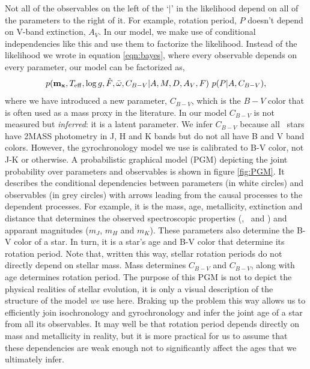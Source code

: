 Not all of the observables on the left of the `$|$' in the likelihood depend
on all of the parameters to the right of it.
For example, rotation period, $P$ doesn't depend on V-band extinction, $A_V$.
In our model, we make use of conditional independencies like this and use them
to factorize the likelihood.
Instead of the likelihood we wrote in equation \ref{eqn:bayes},
where every observable depends on every parameter, our model can be factorized
as,
\begin{equation}
    p({\bf m_x}, T_{\mathrm{eff}}, \log g, \hat{F}, \bar{\omega}, C_{B-V}|A,
    M, D, A_V, F)
    ~p(P|A, C_{B-V}),
\label{eqn:factorized}
\end{equation}
where we have introduced a new parameter, $C_{B-V}$, which is the $B-V$ color
that is often used as a mass proxy in the literature.
In our model $C_{B-V}$ is not measured but {\it inferred}: it is a latent
parameter.
We infer $C_{B-V}$ because all \kepler\ stars have 2MASS photometry in J, H
and K bands but do not all have B and V band colors.
However, the gyrochronology model we use is calibrated to B-V color, not J-K
or otherwise.
A probabilistic graphical model (PGM) depicting the joint probability over
parameters and observables is shown in figure \ref{fig:PGM}.
It describes the conditional dependencies between parameters (in white
circles) and observables (in grey circles) with arrows leading from the causal
processes to the dependent processes.
For example, it is the mass, age, metallicity, extinction and distance that
determines the observed spectroscopic properties (\teff, \logg\ and \feh)
and apparant magnitudes ($m_J$, $m_H$ and $m_K$).
These parameters also determine the B-V color of a star.
In turn, it is a star's age and B-V color that determine its rotation period.
Note that, written this way, stellar rotation periods do not directly depend
on stellar mass.
Mass determines $C_{B-V}$ and $C_{B-V}$, along with age determines rotation
period.
The purpose of this PGM is not to depict the physical realities of stellar
evolution, it is only a visual description of the structure of the model {\it
we} use here.
Braking up the problem this way allows us to efficiently join isochronology
and gyrochronology and infer the joint age of a star from all its observables.
It may well be that rotation period depends directly on mass and metallicity
in reality, but it is more practical for us to assume that these dependencies are
weak enough not to significantly affect the ages that we ultimately infer.

